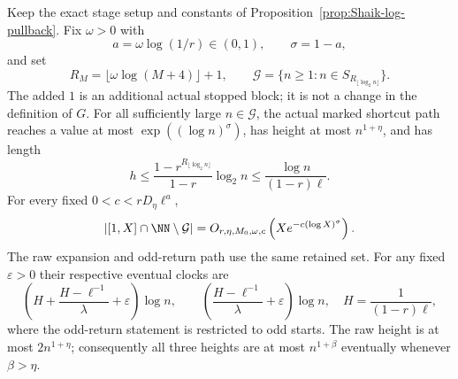 \begin{proposition}
\label{prop:Shaik-matched-schedule}
Keep the exact stage setup and constants of
Proposition~\ref{prop:Shaik-log-pullback}. Fix \(\omega>0\) with
\[
 a=\omega\log(1/r)\in(0,1),\qquad \sigma=1-a,
\]
and set
\begin{equation}\label{eq:Shaik-matched-depth}
 R_M=\lfloor\omega\log(M+4)\rfloor+1,\qquad
 \mathcal G=\{n\ge1:n\in S_{R_{\lfloor\log_2n\rfloor}}\}.
\end{equation}
The added \(1\) is an additional actual stopped block; it is not a
change in the definition of \(G\).
For all sufficiently large \(n\in\mathcal G\), the actual marked
shortcut path reaches a value at most
\(\exp((\log n)^\sigma)\), has height at most \(n^{1+\eta}\), and
has length
\begin{equation}\label{eq:Shaik-matched-clock}
 h\le \frac{1-r^{R_{\lfloor\log_2n\rfloor}}}{1-r}\log_2n
       \le\frac{\log n}{(1-r)\ell}.
\end{equation}
For every fixed \(0<c<rD_\eta\ell^a\),
\begin{equation}\label{eq:Shaik-matched-rate}
 |[1,X]\cap\NN\setminus\mathcal G|
 =O_{r,\eta,M_0,\omega,c}
       \left(Xe^{-c(\log X)^\sigma}\right).
\end{equation}
The raw expansion and odd-return path use the same retained set.
For any fixed \(\varepsilon>0\) their respective eventual clocks are
\[
 \left(H+\frac{H-\ell^{-1}}{\lambda}+\varepsilon\right)\log n,
 \qquad
 \left(\frac{H-\ell^{-1}}{\lambda}+\varepsilon\right)\log n,
 \quad H=\frac1{(1-r)\ell},
\]
where the odd-return statement is restricted to odd starts.
The raw height is at most \(2n^{1+\eta}\); consequently all three
heights are at most \(n^{1+\beta}\) eventually whenever \(\beta>\eta\).
\end{proposition}
